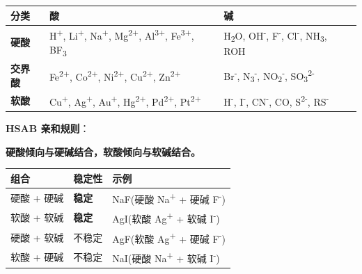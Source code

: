 {\def\LTcaptype{none} %
\begin{longtable}[]{@{}
  >{\raggedright\arraybackslash}p{}
  >{\raggedright\arraybackslash}p{}
  >{\raggedright\arraybackslash}p{}@{}}
\toprule\noalign{}
\begin{minipage}[b]{\linewidth}\raggedright
分类
\end{minipage} & \begin{minipage}[b]{\linewidth}\raggedright
酸
\end{minipage} & \begin{minipage}[b]{\linewidth}\raggedright
碱
\end{minipage} \\
\midrule\noalign{}
\endhead
\bottomrule\noalign{}
\endlastfoot
\textbf{硬酸} & H\textsuperscript{+}, Li\textsuperscript{+}, Na\textsuperscript{+}, Mg\textsuperscript{2+}, Al\textsuperscript{3+}, Fe\textsuperscript{3+}, BF\textsubscript{3} & H\textsubscript{2}O, OH\textsuperscript{-}, F\textsuperscript{-}, Cl\textsuperscript{-}, NH\textsubscript{3}, ROH \\
\textbf{交界酸} & Fe\textsuperscript{2+}, Co\textsuperscript{2+}, Ni\textsuperscript{2+}, Cu\textsuperscript{2+}, Zn\textsuperscript{2+} & Br\textsuperscript{-}, N\textsubscript{3}\textsuperscript{-}, NO\textsubscript{2}\textsuperscript{-}, SO\textsubscript{3}\textsuperscript{2-} \\
\textbf{软酸} & Cu\textsuperscript{+}, Ag\textsuperscript{+}, Au\textsuperscript{+}, Hg\textsuperscript{2+}, Pd\textsuperscript{2+}, Pt\textsuperscript{2+} & H\textsuperscript{-}, I\textsuperscript{-}, CN\textsuperscript{-}, CO, S\textsuperscript{2-}, RS\textsuperscript{-} \\
\end{longtable}
}

\textbf{HSAB 亲和规则}：

\textbf{硬酸倾向与硬碱结合，软酸倾向与软碱结合。}

{\def\LTcaptype{none} %
\begin{longtable}[]{@{}lll@{}}
\toprule\noalign{}
组合 & 稳定性 & 示例 \\
\midrule\noalign{}
\endhead
\bottomrule\noalign{}
\endlastfoot
硬酸 + 硬碱 & \textbf{稳定} & NaF(硬酸 Na\textsuperscript{+} + 硬碱 F\textsuperscript{-}) \\
软酸 + 软碱 & \textbf{稳定} & AgI(软酸 Ag\textsuperscript{+} + 软碱 I\textsuperscript{-}) \\
硬酸 + 软碱 & 不稳定 & AgF(软酸 Ag\textsuperscript{+} + 硬碱 F\textsuperscript{-}) \\
软酸 + 硬碱 & 不稳定 & NaI(硬酸 Na\textsuperscript{+} + 软碱 I\textsuperscript{-}) \\
\end{longtable}
}

